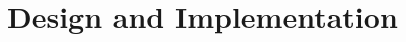 \documentclass[conference, draftclsnofoot, draft]{IEEEtran}
\begin{document}
\section{Design and Implementation}








\end{document}

